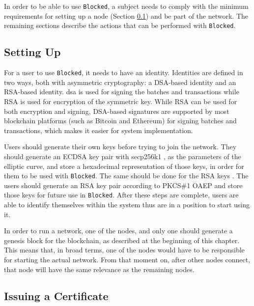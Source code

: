 In order to be able to use \texttt{Blocked}, a subject needs to comply with the minimum requirements for setting up a node (Section \ref{sec:design-setup}) and be part of the network. The remaining sections describe the actions that can be performed with \texttt{Blocked}.

\subsection{Setting Up}
\label{sec:design-setup}

For a user to use \texttt{Blocked}, it needs to have an identity. Identities are defined in two ways, both with asymmetric cryptography: a DSA-based identity and an RSA-based identity. \gls{dsa} \cite{cameron_f._kerry_digital_2013} is used for signing the batches and transactions while RSA \cite{rivest_method_1978} is used for encryption of the symmetric key. While RSA \cite{rivest_method_1978} can be used for both encryption and signing, DSA-based signatures are supported by most blockchain platforms (such as Bitcoin and Ethereum) for signing batches and transactions, which makes it easier for system implementation.

Users should generate their own keys before trying to join the network. They should generate an ECDSA \cite{johnson_elliptic_2001} key pair with secp256k1 \cite{secp256k1}, as the parameters of the elliptic curve, and store a hexadecimal representation of those keys, in order for them to be used with \texttt{Blocked}. The same should be done for the RSA keys \cite{rivest_method_1978}. The users should generate an RSA \cite{rivest_method_1978} key pair according to PKCS\#1 OAEP \cite{moriarty_pkcs_2016} and store those keys for future use in \texttt{Blocked}. After these steps are complete, users are able to identify themselves within the system thus are in a position to start using it.

In order to run a network, one of the nodes, and only one should generate a genesis block for the blockchain, as described at the beginning of this chapter. This means that, in broad terms, one of the nodes would have to be responsible for starting the actual network. From that moment on, after other nodes connect, that node will have the same relevance as the remaining nodes.

\subsection{Issuing a Certificate}

